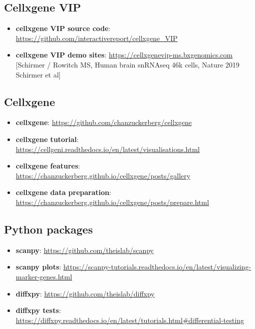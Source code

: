 \documentclass[
]{article}
\providecommand{\tightlist}{%
  \setlength{\itemsep}{0pt}\setlength{\parskip}{0pt}}
\begin{document}
\hypertarget{cellxgene-vip}{%
\subsection*{Cellxgene VIP}\label{cellxgene-vip}}

\begin{itemize}
\tightlist
\item
  \textbf{cellxgene VIP source code}: \url{https://github.com/interactivereport/cellxgene_VIP}
\item
  \textbf{cellxgene VIP demo sites}: \url{https://cellxgenevip-ms.bxgenomics.com} {[}Schirmer / Rowitch MS, Human brain snRNAseq 46k cells, Nature 2019 Schirmer et al{]}
\end{itemize}

\hypertarget{cellxgene}{%
\subsection*{Cellxgene}\label{cellxgene}}

\begin{itemize}
\tightlist
\item
  \textbf{cellxgene}: \url{https://github.com/chanzuckerberg/cellxgene}
\item
  \textbf{cellxgene tutorial}: \url{https://cellgeni.readthedocs.io/en/latest/visualisations.html}
\item
  \textbf{cellxgene features}: \url{https://chanzuckerberg.github.io/cellxgene/posts/gallery}
\item
  \textbf{cellxgene data preparation}: \url{https://chanzuckerberg.github.io/cellxgene/posts/prepare.html}
\end{itemize}

\hypertarget{python-packages}{%
\subsection*{Python packages}\label{python-packages}}

\begin{itemize}
\tightlist
\item
  \textbf{scanpy}: \url{https://github.com/theislab/scanpy}
\item
  \textbf{scanpy plots}: \url{https://scanpy-tutorials.readthedocs.io/en/latest/visualizing-marker-genes.html}
\item
  \textbf{diffxpy}: \url{https://github.com/theislab/diffxpy}
\item
  \textbf{diffxpy tests}: \url{https://diffxpy.readthedocs.io/en/latest/tutorials.html\#differential-testing}
\end{itemize}
\end{document}
